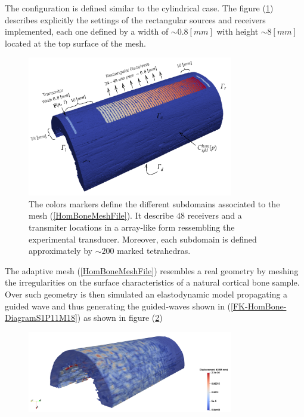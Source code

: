The configuration is defined similar to the cylindrical case. The figure (\ref{HomBoneSubdomainsFile}) describes explicitly the settings of the rectangular sources and receivers implemented, each one defined by a width of $\sim 0.8 [mm]$ with height $\sim 8 [mm]$ located at the top surface of the mesh.
\begin{figure}[!h]
	\centering
	\includegraphics[width=0.8\textwidth]{images/ImgExt/Cortical3dsc04Mesh1000Fill-MeshBoundaries.png}
	\caption{The colors markers define the different subdomains associated to the mesh (\ref{HomBoneMeshFile}). It describe $48$ receivers and a transmiter locations in a array-like form ressembling the experimental transducer. Moreover, each subdomain is defined approximately by $\sim 200$ marked tetrahedras.}
	\label{HomBoneSubdomainsFile}
\end{figure} 
The adaptive mesh (\ref{HomBoneMeshFile}) resembles a real geometry by meshing the irregularities on the surface characteristics of a natural cortical bone sample. Over such geometry is then simulated an elastodynamic model propagating a guided wave and thus generating the guided-waves shown in (\ref{FK-HomBone-DiagramS1P11M18}) as shown in figure (\ref{HomBone-TimeStep})

\begin{figure}[!h]
	\centering
	\includegraphics[width=0.8\textwidth]{images/ImgExt/Cortical3dsc04Mesh1000Fill-T80.png}
	\caption{}
	\label{HomBone-TimeStep}
\end{figure} 

